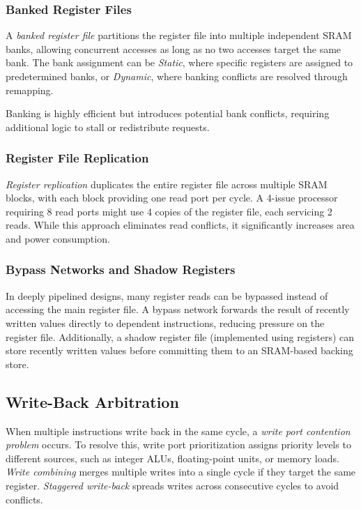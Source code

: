 \subsubsection{Banked Register Files}
A \textit{banked register file} partitions the register file into multiple independent SRAM banks, allowing concurrent accesses as long as no two accesses target the same bank. The bank assignment can be \textit{Static}, where specific registers are assigned to predetermined banks, or \textit{Dynamic}, where banking conflicts are resolved through remapping.

Banking is highly efficient but introduces potential bank conflicts, requiring additional logic to stall or redistribute requests.

\subsubsection{Register File Replication}
\textit{Register replication} duplicates the entire register file across multiple SRAM blocks, with each block providing one read port per cycle. A 4-issue processor requiring 8 read ports might use 4 copies of the register file, each servicing 2 reads. While this approach eliminates read conflicts, it significantly increases area and power consumption.

\subsubsection{Bypass Networks and Shadow Registers}
In deeply pipelined designs, many register reads can be bypassed instead of accessing the main register file. A bypass network forwards the result of recently written values directly to dependent instructions, reducing pressure on the register file. Additionally, a shadow register file (implemented using registers) can store recently written values before committing them to an SRAM-based backing store.

\subsection{Write-Back Arbitration}
When multiple instructions write back in the same cycle, a \textit{write port contention problem} occurs. To resolve this, write port prioritization assigns priority levels to different sources, such as integer ALUs, floating-point units, or memory loads. \textit{Write combining} merges multiple writes into a single cycle if they target the same register. \textit{Staggered write-back} spreads writes across consecutive cycles to avoid conflicts.

